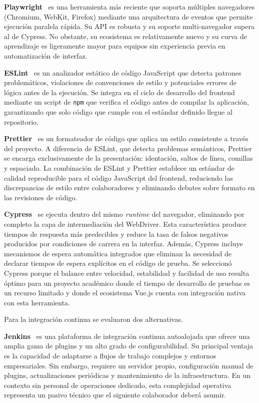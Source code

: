 \textbf{Playwright}~\cite{playwright2024} es una herramienta m\'{a}s reciente que soporta m\'{u}ltiples navegadores (Chromium, WebKit, Firefox) mediante una arquitectura de eventos que permite ejecuci\'{o}n paralela r\'{a}pida. Su API es robusta y su soporte multi-navegador supera al de Cypress. No obstante, su ecosistema es relativamente nuevo y su curva de aprendizaje es ligeramente mayor para equipos sin experiencia previa en automatizaci\'{o}n de interfaz.

\textbf{ESLint}~\cite{eslint2024} es un analizador est\'{a}tico de c\'{o}digo JavaScript que detecta patrones problem\'{a}ticos, violaciones de convenciones de estilo y potenciales errores de l\'{o}gica antes de la ejecuci\'{o}n. Se integra en el ciclo de desarrollo del frontend mediante un script de \texttt{npm} que verifica el c\'{o}digo antes de compilar la aplicaci\'{o}n, garantizando que solo c\'{o}digo que cumple con el est\'{a}ndar definido llegue al repositorio.

\textbf{Prettier}~\cite{prettier2024} es un formateador de c\'{o}digo que aplica un estilo consistente a trav\'{e}s del proyecto. A diferencia de ESLint, que detecta problemas sem\'{a}nticos, Prettier se encarga exclusivamente de la presentaci\'{o}n: identaci\'{o}n, saltos de l\'{i}nea, comillas y espaciado. La combinaci\'{o}n de ESLint y Prettier establece un est\'{a}ndar de calidad reproducible para el c\'{o}digo JavaScript del frontend, reduciendo las discrepancias de estilo entre colaboradores y eliminando debates sobre formato en las revisiones de c\'{o}digo.

\textbf{Cypress}~\cite{cypress2024} se ejecuta dentro del mismo \textit{runtime} del navegador, eliminando por completo la capa de intermediaci\'{o}n del WebDriver. Esta caracter\'{i}stica produce tiempos de respuesta m\'{a}s predecibles y reduce la tasa de falsos negativos producidos por condiciones de carrera en la interfaz. Adem\'{a}s, Cypress incluye mecanismos de espera autom\'{a}tica integrados que eliminan la necesidad de declarar tiempos de espera expl\'{i}citos en el c\'{o}digo de prueba. Se seleccion\'{o} Cypress porque el balance entre velocidad, estabilidad y facilidad de uso resulta \'{o}ptimo para un proyecto acad\'{e}mico donde el tiempo de desarrollo de pruebas es un recurso limitado y donde el ecosistema Vue.js cuenta con integraci\'{o}n nativa con esta herramienta.

Para la integraci\'{o}n continua se evaluaron dos alternativas.

\textbf{Jenkins}~\cite{jenkins2024} es una plataforma de integraci\'{o}n continua autoalojada que ofrece una amplia gama de plugins y un alto grado de configurabilidad. Su principal ventaja es la capacidad de adaptarse a flujos de trabajo complejos y entornos empresariales. Sin embargo, requiere un servidor propio, configuraci\'{o}n manual de plugins, actualizaciones peri\'{o}dicas y mantenimiento de la infraestructura. En un contexto sin personal de operaciones dedicado, esta complejidad operativa representa un pasivo t\'{e}cnico que el siguiente colaborador deber\'{a} asumir.

